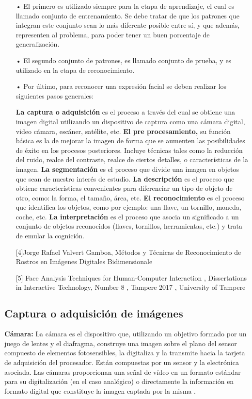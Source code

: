 \begin{itemize}
\item[•] El primero es utilizado siempre para la etapa de aprendizaje, el cual es llamado conjunto de entrenamiento. Se debe tratar de que los patrones que integran este conjunto sean lo más diferente posible entre sí, y que además, representen al problema, para poder tener un buen porcentaje de generalización.
\item[•] El segundo conjunto de patrones, es llamado conjunto de prueba, y es utilizado en la etapa de reconocimiento.
\item[•] Por último, para reconocer una expresión facial se deben realizar los siguientes pasos generales: \vskip 0.1cm

{\bf La captura o adquisición} es el proceso a través del cual se obtiene una imagen digital utilizando un dispositivo de captura como una cámara digital, video cámara, escáner, satélite, etc.
\vskip 0.1cm
{\bf El pre procesamiento,} su función básica es la de mejorar la imagen de forma que se aumenten las posibilidades de éxito en los procesos posteriores. Incluye técnicas tales como la reducción del ruido, realce del contraste, realce de ciertos detalles, o características de la imagen. 
\vskip 0.1cm
{\bf La segmentación} es el proceso que divide una imagen en objetos que sean de nuestro interés de estudio. 
\vskip 0.1cm
{\bf La descripción} es el proceso que obtiene características convenientes para diferenciar un tipo de objeto de otro, como: la forma, el tamaño, área, etc.
\vskip 0.1cm
{\bf El reconocimiento} es el proceso que identifica los objetos, como por ejemplo: una llave, un tornillo, moneda, coche, etc.
\vskip 0.1cm
{\bf La interpretación} es el proceso que asocia un significado a un conjunto de objetos reconocidos (llaves, tornillos, herramientas, etc.) y trata de emular la cognición.

[4]Jorge Rafael Valvert Gamboa, Métodos y Técnicas de Reconocimiento de Rostros en Imágenes Digitales Bidimensionale

[5] Face Analysis Techniques for Human-Computer Interaction , Dissertations in Interactive Technology, Number 8 , Tampere 2017 , University of Tampere 
 
\end{itemize}

\subsection{Captura o adquisición de imágenes}
{\bf Cámara:} \vskip 0.1cm
La cámara es el dispositivo que, utilizando un objetivo formado por un juego de lentes y el diafragma, construye una imagen sobre el plano del sensor compuesto de elementos fotosensibles, la digitaliza y la transmite hacia la tarjeta de adquisición del procesador. Están compuestas por un sensor y la electrónica asociada. Las cámaras proporcionan una señal de vídeo en un formato estándar para su digitalización (en el caso analógico) o directamente la información en formato digital que constituye la imagen captada por la misma \citep{Enrique}.
\vskip 0.1cm


